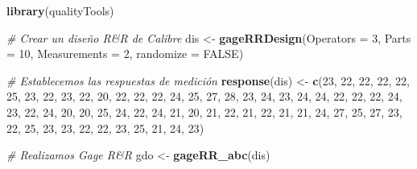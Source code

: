 \documentclass[
]{book}
\newenvironment{Shaded}{\begin{snugshade}}{\end{snugshade}}
\newcommand{\AttributeTok}[1]{\textcolor[rgb]{0.13,0.29,0.53}{#1}}
\newcommand{\CommentTok}[1]{\textcolor[rgb]{0.56,0.35,0.01}{\textit{#1}}}
\newcommand{\ConstantTok}[1]{\textcolor[rgb]{0.56,0.35,0.01}{#1}}
\newcommand{\DecValTok}[1]{\textcolor[rgb]{0.00,0.00,0.81}{#1}}
\newcommand{\FunctionTok}[1]{\textcolor[rgb]{0.13,0.29,0.53}{\textbf{#1}}}
\newcommand{\NormalTok}[1]{#1}
\newcommand{\OtherTok}[1]{\textcolor[rgb]{0.56,0.35,0.01}{#1}}
\begin{document}
\begin{Shaded}
\begin{Highlighting}[]
\FunctionTok{library}\NormalTok{(qualityTools)}

\CommentTok{\# Crear un diseño R\&R de Calibre}
\NormalTok{dis }\OtherTok{\textless{}{-}} \FunctionTok{gageRRDesign}\NormalTok{(}\AttributeTok{Operators =} \DecValTok{3}\NormalTok{, }\AttributeTok{Parts =} \DecValTok{10}\NormalTok{, }\AttributeTok{Measurements =} \DecValTok{2}\NormalTok{, }\AttributeTok{randomize =} \ConstantTok{FALSE}\NormalTok{)}

\CommentTok{\# Establecemos las respuestas de medición}
\FunctionTok{response}\NormalTok{(dis) }\OtherTok{\textless{}{-}}  \FunctionTok{c}\NormalTok{(}\DecValTok{23}\NormalTok{, }\DecValTok{22}\NormalTok{, }\DecValTok{22}\NormalTok{, }\DecValTok{22}\NormalTok{, }\DecValTok{22}\NormalTok{, }\DecValTok{25}\NormalTok{, }\DecValTok{23}\NormalTok{, }\DecValTok{22}\NormalTok{, }\DecValTok{23}\NormalTok{, }\DecValTok{22}\NormalTok{, }\DecValTok{20}\NormalTok{, }\DecValTok{22}\NormalTok{, }\DecValTok{22}\NormalTok{, }\DecValTok{22}\NormalTok{, }\DecValTok{24}\NormalTok{, }\DecValTok{25}\NormalTok{, }\DecValTok{27}\NormalTok{, }\DecValTok{28}\NormalTok{, }\DecValTok{23}\NormalTok{, }\DecValTok{24}\NormalTok{, }\DecValTok{23}\NormalTok{, }\DecValTok{24}\NormalTok{, }\DecValTok{24}\NormalTok{, }\DecValTok{22}\NormalTok{, }\DecValTok{22}\NormalTok{, }\DecValTok{22}\NormalTok{, }\DecValTok{24}\NormalTok{, }\DecValTok{23}\NormalTok{, }\DecValTok{22}\NormalTok{, }\DecValTok{24}\NormalTok{, }\DecValTok{20}\NormalTok{, }\DecValTok{20}\NormalTok{, }\DecValTok{25}\NormalTok{, }\DecValTok{24}\NormalTok{, }\DecValTok{22}\NormalTok{, }\DecValTok{24}\NormalTok{, }\DecValTok{21}\NormalTok{, }\DecValTok{20}\NormalTok{, }\DecValTok{21}\NormalTok{, }\DecValTok{22}\NormalTok{, }\DecValTok{21}\NormalTok{, }\DecValTok{22}\NormalTok{, }\DecValTok{21}\NormalTok{, }\DecValTok{21}\NormalTok{, }\DecValTok{24}\NormalTok{, }\DecValTok{27}\NormalTok{,  }\DecValTok{25}\NormalTok{, }\DecValTok{27}\NormalTok{, }\DecValTok{23}\NormalTok{, }\DecValTok{22}\NormalTok{, }\DecValTok{25}\NormalTok{, }\DecValTok{23}\NormalTok{, }\DecValTok{23}\NormalTok{, }\DecValTok{22}\NormalTok{, }\DecValTok{22}\NormalTok{, }\DecValTok{23}\NormalTok{, }\DecValTok{25}\NormalTok{, }\DecValTok{21}\NormalTok{, }\DecValTok{24}\NormalTok{, }\DecValTok{23}\NormalTok{)}

\CommentTok{\# Realizamos Gage R\&R}
\NormalTok{gdo }\OtherTok{\textless{}{-}} \FunctionTok{gageRR\_abc}\NormalTok{(dis)}
\end{Highlighting}
\end{Shaded}
\end{document}
